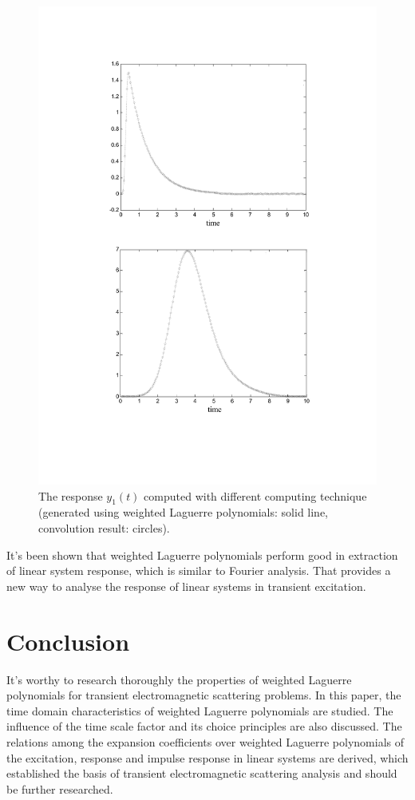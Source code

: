 \documentclass[conference, a4paper]{IEEEtran}
\begin{document}
\begin{figure}
    \centering
    \includegraphics[scale=.5]{fig5.pdf}
    \caption{The response $y_1(t)$ computed with different computing
    technique (generated using weighted Laguerre polynomials: solid
    line, convolution result: circles).}
    \label{figy1}
\end{figure}

It's been shown that weighted Laguerre polynomials perform good in
extraction of linear system response, which is similar to Fourier
analysis. That provides a new way to analyse the response of linear
systems in transient excitation.

\section{Conclusion}

It's worthy to research thoroughly the properties of weighted Laguerre
polynomials for transient electromagnetic scattering problems. In this
paper, the time domain characteristics of weighted Laguerre polynomials are
studied. The influence of the time scale factor and its choice
principles are also discussed. 
The relations among the expansion coefficients over weighted Laguerre
polynomials of the excitation, response and impulse response in linear
systems are derived, which established the basis of transient
electromagnetic scattering analysis and should be further researched.
\end{document}
